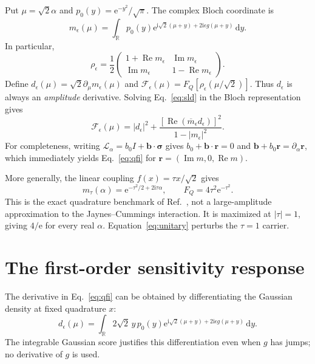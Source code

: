 \documentclass[aps,pra,reprint,amsmath,amssymb,nofootinbib,floatfix]{revtex4-2}
\newcommand{\Rea}{\operatorname{Re}}
\newcommand{\Ima}{\operatorname{Im}}
\newcommand{\dd}{\mathrm{d}}
\newcommand{\ii}{\mathrm{i}}
\newcommand{\ee}{\mathrm{e}}
\begin{document}
Put $\mu=\sqrt2\alpha$ and $p_0(y)=\ee^{-y^2}/\sqrt\pi$. The complex
Bloch coordinate is
\begin{equation}
 m_\epsilon(\mu)=\int_{\mathbb R}p_0(y)
 \ee^{\ii\sqrt2(\mu+y)+2\ii\epsilon g(\mu+y)}\,\dd y.
 \label{eq:m}
\end{equation}
In particular,
\begin{equation}
 \rho_\epsilon=\frac12
 \begin{pmatrix}1+\Rea m_\epsilon&\Ima m_\epsilon\\
 \Ima m_\epsilon&1-\Rea m_\epsilon\end{pmatrix}.
 \label{eq:blochstate}
\end{equation}
Define $d_\epsilon(\mu)=\sqrt2\partial_\mu m_\epsilon(\mu)$ and
$\mathcal F_\epsilon(\mu)=F_Q[\rho_\epsilon(\mu/\sqrt2)]$. Thus
$d_\epsilon$ is always an \emph{amplitude} derivative. Solving
Eq.~\eqref{eq:sld} in the Bloch representation gives
\begin{equation}
 \mathcal F_\epsilon(\mu)=|d_\epsilon|^2+
 \frac{[\Rea(\overline m_\epsilon d_\epsilon)]^2}
 {1-|m_\epsilon|^2}.
 \label{eq:qfi}
\end{equation}
For completeness, writing $\mathcal L_\alpha=b_0 I+\bm b\cdot\bm\sigma$
gives $b_0+\bm b\cdot\bm r=0$ and
$\bm b+b_0\bm r=\partial_\alpha\bm r$, which immediately yields
Eq.~\eqref{eq:qfi} for $\bm r=(\Ima m,0,\Rea m)$.

More generally, the linear coupling $f(x)=\tau x/\sqrt2$ gives
\begin{equation}
 m_\tau(\alpha)=\ee^{-\tau^2/2+2\ii\tau\alpha},
 \qquad F_Q=4\tau^2\ee^{-\tau^2}.
 \label{eq:baseline}
\end{equation}
This is the exact quadrature benchmark of Ref.~\cite{ravell2026},
not a large-amplitude approximation to the Jaynes--Cummings interaction.
It is maximized at $|\tau|=1$, giving $4/\ee$ for every real $\alpha$.
Equation~\eqref{eq:unitary} perturbs the $\tau=1$ carrier.

\section{The first-order sensitivity response}

The derivative in Eq.~\eqref{eq:qfi} can be obtained by differentiating
the Gaussian density at fixed quadrature $x$:
\begin{equation}
 d_\epsilon(\mu)=\int_{\mathbb R}2\sqrt2\,y\,p_0(y)
 \ee^{\ii\sqrt2(\mu+y)+2\ii\epsilon g(\mu+y)}\,\dd y.
 \label{eq:score}
\end{equation}
The integrable Gaussian score justifies this differentiation even when
$g$ has jumps; no derivative of $g$ is used.
\end{document}
